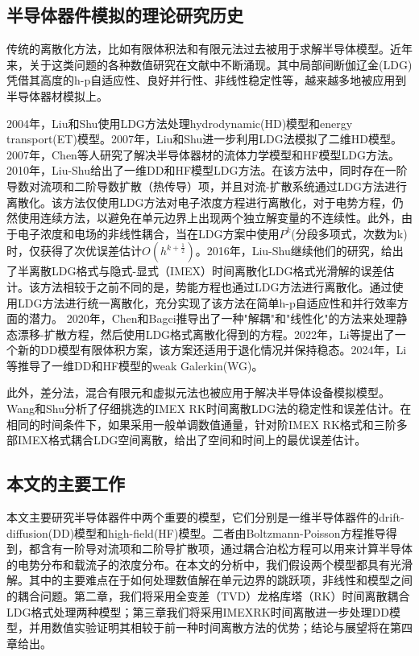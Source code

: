 \subsection{半导体器件模拟的理论研究历史}
传统的离散化方法，比如有限体积法\cite{bank1983numerical,bank1998finite,chainais2003finite,bessemoulin2012finite}和有限元法\cite{brezzi1989two,mauri20153d}过去被用于求解半导体模型。近年来，关于这类问题的各种数值研究在文献中不断涌现。其中局部间断伽辽金(LDG)凭借其高度的h-p自适应性、良好并行性、非线性稳定性等，越来越多地被应用到半导体器材模拟上。

2004年，Liu和Shu使用LDG方法处理hydrodynamic(HD)模型和energy transport(ET)模型\cite{liu2004locala}。2007年，Liu和Shu进一步利用LDG法模拟了二维HD模型\cite{liu2007localb}。2007年，Chen等人研究了解决半导体器材的流体力学模型和HF模型LDG方法\cite{chen2007discontinuous}。2010年，Liu-Shu给出了一维DD和HF模型LDG方法\cite{liu2010error}。在该方法中，同时存在一阶导数对流项和二阶导数扩散（热传导）项，并且对流-扩散系统通过LDG方法进行离散化。该方法仅使用LDG方法对电子浓度方程进行离散化，对于电势方程，仍然使用连续方法，以避免在单元边界上出现两个独立解变量的不连续性。此外，由于电子浓度和电场的非线性耦合，当在LDG方案中使用$P^k$(分段多项式，次数为k)时，仅获得了次优误差估计$O(h^{k+\frac{1}{2}})$。2016年，Liu-Shu继续他们的研究，给出了半离散LDG格式与隐式-显式（IMEX）时间离散化LDG格式光滑解的误差估计\cite{liu2016analysis}。该方法相较于之前不同的是，势能方程也通过LDG方法进行离散化。通过使用LDG方法进行统一离散化，充分实现了该方法在简单h-p自适应性和并行效率方面的潜力。
2020年，Chen和Bagci推导出了一种"解耦"和"线性化"的方法来处理静态漂移-扩散方程，然后使用LDG格式离散化得到的方程\cite{chen2020steady}。2022年，Li等提出了一个新的DD模型有限体积方案，该方案还适用于退化情况并保持稳态\cite{li2022stabilized}。2024年，Li等推导了一维DD和HF模型的weak Galerkin(WG)。

此外，差分法\cite{ding2019optimal}，混合有限元\cite{gao2018linearized}和虚拟元法\cite{liu2021virtual}也被应用于解决半导体设备模拟模型。
Wang和Shu分析了仔细挑选的IMEX RK时间离散LDG法的稳定性和误差估计\cite{wang2015stability,wang2016stability}。在相同的时间条件下，如果采用一般单调数值通量，针对阶IMEX RK格式和三阶多部IMEX格式耦合LDG空间离散，给出了空间和时间上的最优误差估计。
\subsection{本文的主要工作}
本文主要研究半导体器件中两个重要的模型，它们分别是一维半导体器件的drift-diffusion(DD)模型和high-field(HF)模型。二者由Boltzmann-Poisson方程推导得到，都含有一阶导对流项和二阶导扩散项，通过耦合泊松方程可以用来计算半导体的电势分布和载流子的浓度分布。在本文的分析中，我们假设两个模型都具有光滑解。其中的主要难点在于如何处理数值解在单元边界的跳跃项，非线性和模型之间的耦合问题。第二章，我们将采用全变差（TVD）龙格库塔（RK）时间离散耦合LDG格式处理两种模型；第三章我们将采用IMEXRK时间离散进一步处理DD模型，并用数值实验证明其相较于前一种时间离散方法的优势；结论与展望将在第四章给出。
